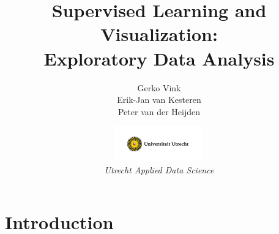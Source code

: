 \documentclass[xcolor=table,aspectratio=169]{beamer}
\title[SLV: EDA]{
	{\LARGE{Supervised Learning and Visualization}:\\\large{Exploratory Data Analysis}}
}
\institute{
	\footnotesize Department of Methodology and Statistics\\
}
\author[Vink | van Kesteren | van der Heijden]{Gerko Vink\\Erik-Jan van Kesteren\\Peter van der Heijden}
\date{\includegraphics[height=1.5cm]{pics/uu-logo.png}\\
	
	\footnotesize{\emph{Utrecht Applied Data Science}}}
\begin{document}
\begin{frame}
\maketitle
\end{frame}


\section{Introduction}\subsection{}
\end{document}
